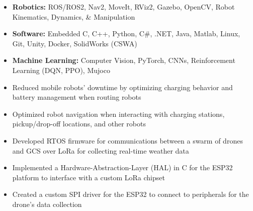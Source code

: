 \documentclass[10pt,a4paper,ragged2e,withhyper]{altacv}
\begin{document}
\tagline{}
\makecvheader


    \vspace{-1.75em}
    \vspace{-1.6em}
    \begin{itemize}
        \item[] \textbf{Robotics:} ROS/ROS2, Nav2, MoveIt, RViz2, Gazebo, OpenCV, Robot Kinematics, Dynamics, \& Manipulation
        \item[] \textbf{Software:} Embedded C, C++, Python, C\#, .NET, Java, Matlab, Linux, Git, Unity, Docker, SolidWorks (CSWA)
        \item[] \textbf{Machine Learning:} Computer Vision, PyTorch, CNNs, Reinforcement Learning (DQN, PPO), Mujoco
    \end{itemize}
    \vspace{-1.5em}
    \begin{itemize}
        \item Reduced mobile robots' downtime by optimizing charging behavior and battery management when routing robots
        \item Optimized robot navigation when interacting with charging stations, pickup/drop-off locations, and other robots
    \end{itemize}
    \begin{itemize}
        \item Developed RTOS firmware for communications between a swarm of drones and GCS over LoRa for collecting real-time weather data
        \item Implemented a Hardware-Abstraction-Layer (HAL) in C for the ESP32 platform to interface with a custom LoRa chipset
        \item Created a custom SPI driver for the ESP32 to connect to peripherals for the drone's data collection
    \end{itemize}
\end{document}
